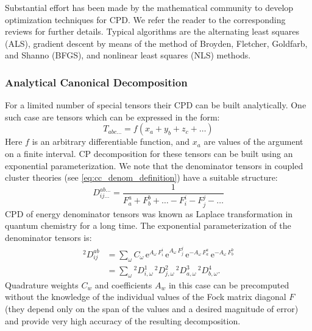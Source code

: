 Substantial effort has been made by the mathematical community to develop 
optimization techniques for CPD. We refer the reader to the corresponding 
reviews\cite{kolda2009tensor, sidiropoulos2016tensor} for further details. 
Typical algorithms are the alternating least squares 
(ALS),\cite{comon2009tensor} gradient descent by 
means of the method of Broyden, Fletcher, Goldfarb, and Shanno 
(BFGS), and nonlinear least squares (NLS) methods.\cite{sorber2013optimization}

\subsubsection{Analytical Canonical Decomposition}
For a limited number of special tensors their CPD can be built analytically. 
One such case are tensors which can be expressed in the form:
%
\begin{equation}
T_{abc\ldots} = 
f(x_{a} + y_{b} + z_{c} + \ldots)
\end{equation}
%
Here $f$ is an arbitrary differentiable function, and $x_{a}$ are values of the 
argument on a finite interval. CP decomposition for these tensors can be 
built using an exponential parameterization.\cite{braess2005approximation} We 
note that the denominator tensors in coupled cluster theories (see 
\ref{eq:cc_denom_definition}) have a suitable structure: 
%
\begin{equation}
D^{ab\ldots}_{ij\ldots} = 
\frac{1}{F_{a}^{a} + F_{b}^{b} + \ldots - F_{i}^{i} - 
F_{j}^{j} - \ldots}
\end{equation}
CPD of energy denominator tensors was known as Laplace 
transformation in quantum chemistry for a long 
time.\cite{almlof1991elimination} The exponential parameterization of the 
denominator tensors is:
%
\begin{subequations}
\begin{align} {}^2D_{ij}^{ab} &= 
\sum_{\omega} C_\omega \, \mathrm{e}^{A_\omega \,
F_i^i} \, \mathrm{e}^{A_\omega \, F_j^j} \, \mathrm{e}^{-A_\omega \,
F_a^a} \, \mathrm{e}^{-A_\omega \, F_b^b} \\ &= \sum_{\omega} {}^2D^1_{i,\omega} 
\,
{}^2D^2_{j,\omega} \, {}^2D^3_{a,\omega} \, {}^2D^4_{b,\omega}.
\end{align}
\end{subequations}
%
Quadrature weights $C_{w}$ and coefficients $A_{w}$ in this case can be 
precomputed without the knowledge of the individual values of the Fock matrix 
diagonal $F$ (they depend only on the span of the values and a desired 
magnitude of error) and provide very high accuracy of the resulting 
decomposition.\cite{braess2005approximation}
%
